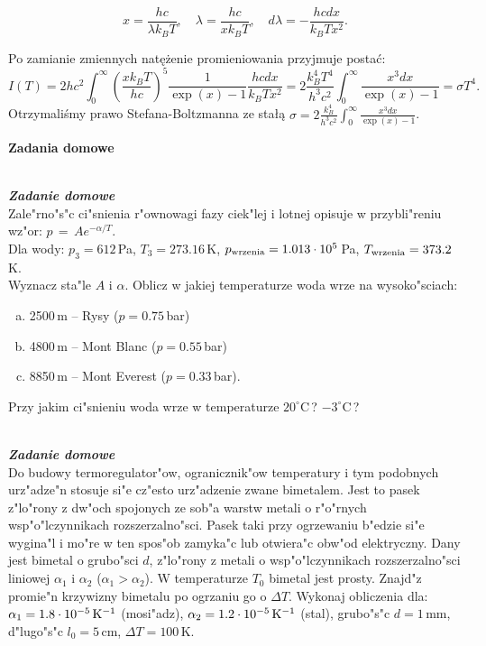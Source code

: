 \documentclass[11pt,a4paper]{article}
\newcounter{zaddom}\newcommand{\zaddom}[1][]{\addtocounter{zaddom}{1} ~\\  {\bf \emph{Zadanie domowe \arabic{zaddom} #1 }} \\}
\begin{document}
\begin{equation}
x = \frac{h c}{\lambda k_B T}, \quad \lambda = \frac{h c}{x k_B T},\quad d\lambda = - \frac{h c dx}{k_B T x^2}.
\end{equation}

Po zamianie zmiennych natężenie promieniowania przyjmuje postać:
\begin{equation}
  I(T) = 2 h c^2 \int_0^\infty \left(\frac{xk_B T}{hc}\right)^5 \frac{1}{\exp(x)-1}
  \frac{h c dx}{k_B T x^2} =
  2 \frac{k_B^4 T^4}{h^3 c^2} \int_0^\infty \frac{x^3 dx}{\exp(x)-1} = \sigma T^4.
\end{equation}
Otrzymaliśmy prawo Stefana-Boltzmanna ze stałą $\sigma = 2 \frac{k_B^4}{h^3 c^2} \int_0^\infty \frac{x^3 dx}{\exp(x)-1}$.

\pagebreak
\begin{centering}
\bf{ Zadania domowe }\\[1mm]
\end{centering}
\vspace{1mm}

\zaddom
Zale"rno"s"c ci"snienia r"ownowagi fazy ciek"lej i lotnej opisuje 
w przybli"reniu wz"or: $ p \,=\, A e^{-\alpha/T} $.\\
Dla wody: $p_3 = 612\,$Pa, $T_3 = 273.16\,$K, 
$p_{\rm wrzenia} = 1.013\cdot 10^5\,$Pa, 
$T_{\rm wrzenia} = 373.2\,$K.\\ 
Wyznacz sta"le $A$ i $\alpha$.
Oblicz w jakiej temperaturze woda wrze na wysoko"sciach:
\begin{enumerate}[a)] 
\item 2500\,m -- Rysy ($p = 0.75\,$bar)
\item 4800\,m -- Mont Blanc ($p = 0.55\,$bar)
\item 8850\,m -- Mont Everest ($p = 0.33\,$bar).
\end{enumerate}
Przy jakim ci"snieniu woda wrze w temperaturze $20^\circ$C\,? $-3^\circ$C\,?

\zaddom
Do budowy termoregulator"ow, ogranicznik"ow temperatury i tym
podobnych urz"adze"n stosuje si"e cz"esto urz"adzenie zwane bimetalem.
Jest to pasek z"lo"rony z dw"och spojonych ze sob"a warstw metali
o r"o"rnych wsp"o"lczynnikach rozszerzalno"sci.
Pasek taki przy ogrzewaniu b"edzie si"e wygina"l i mo"re
w ten spos"ob zamyka"c lub otwiera"c obw"od elektryczny.
Dany jest bimetal o grubo"sci $d$, z"lo"rony z metali
o wsp"o"lczynnikach rozszerzalno"sci liniowej $\alpha_1$ i $\alpha_2$
($\alpha_1 > \alpha_2$).
W temperaturze $T_0$ bimetal jest prosty.
Znajd"z promie"n krzywizny bimetalu po ogrzaniu go o $\Delta T$.
Wykonaj obliczenia dla: $\alpha_1=1.8\cdot 10^{-5}\,{\rm K}^{-1}$ (mosi"adz),
$\alpha_2=1.2\cdot 10^{-5}\,{\rm K}^{-1}$ (stal), grubo"s"c $d=1\,$mm,
d"lugo"s"c $l_0=5\,$cm, $\Delta T=100\,$K.
\end{document}
